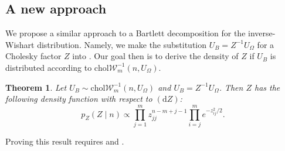 \documentclass[12pt,a4paper,reqno]{amsart}
\numberwithin{equation}{section}
\newtheorem{theorem}{Theorem}[section]
\newcommand{\cholinvwishart}[1]{\mathrm{chol}\mathcal{W}^{-1}_{#1}}
\newcommand{\dmeasure}[1]{\left(\dd{#1}\right)}
\newcommand{\dd}[1]{\mathrm{d}{#1}}
\begin{document}
\subsection{A new approach}

We propose a similar approach to a Bartlett decomposition for the inverse-Wishart distribution.
Namely, we make the substitution $U_B = Z^{-1} U_\Omega$ for a Cholesky factor $Z$ into .
Our goal then is to derive the density of $Z$ if $U_B$ is distributed according to $\cholinvwishart{m}(n, U_\Omega)$.
\begin{theorem}\label{thm:invwishartbartlett}
    Let $U_B \sim \cholinvwishart{m}(n, U_\Omega)$ and $U_B = Z^{-1} U_\Omega$.
    Then $Z$ has the following density function with respect to $\dmeasure{Z}$:
    \begin{equation}\label{invwishartbartlett}
        p_Z(Z \mid n) \propto \prod_{j=1}^m z_{jj}^{n-m+j-1} \prod_{i=j}^m e^{-z_{ij}^2/2}.
    \end{equation}
\end{theorem}

Proving this result requires  and .
\end{document}
